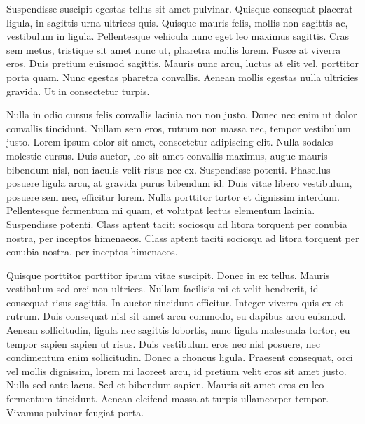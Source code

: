 Suspendisse suscipit egestas tellus sit amet pulvinar. Quisque consequat placerat ligula, in sagittis urna ultrices quis. Quisque mauris felis, mollis non sagittis ac, vestibulum in ligula. Pellentesque vehicula nunc eget leo maximus sagittis. Cras sem metus, tristique sit amet nunc ut, pharetra mollis lorem. Fusce at viverra eros. Duis pretium euismod sagittis. Mauris nunc arcu, luctus at elit vel, porttitor porta quam. Nunc egestas pharetra convallis. Aenean mollis egestas nulla ultricies gravida. Ut in consectetur turpis.

Nulla in odio cursus felis convallis lacinia non non justo. Donec nec enim ut dolor convallis tincidunt. Nullam sem eros, rutrum non massa nec, tempor vestibulum justo. Lorem ipsum dolor sit amet, consectetur adipiscing elit. Nulla sodales molestie cursus. Duis auctor, leo sit amet convallis maximus, augue mauris bibendum nisl, non iaculis velit risus nec ex. Suspendisse potenti. Phasellus posuere ligula arcu, at gravida purus bibendum id. Duis vitae libero vestibulum, posuere sem nec, efficitur lorem. Nulla porttitor tortor et dignissim interdum. Pellentesque fermentum mi quam, et volutpat lectus elementum lacinia. Suspendisse potenti. Class aptent taciti sociosqu ad litora torquent per conubia nostra, per inceptos himenaeos. Class aptent taciti sociosqu ad litora torquent per conubia nostra, per inceptos himenaeos.

Quisque porttitor porttitor ipsum vitae suscipit. Donec in ex tellus. Mauris vestibulum sed orci non ultrices. Nullam facilisis mi et velit hendrerit, id consequat risus sagittis. In auctor tincidunt efficitur. Integer viverra quis ex et rutrum. Duis consequat nisl sit amet arcu commodo, eu dapibus arcu euismod. Aenean sollicitudin, ligula nec sagittis lobortis, nunc ligula malesuada tortor, eu tempor sapien sapien ut risus. Duis vestibulum eros nec nisl posuere, nec condimentum enim sollicitudin. Donec a rhoncus ligula. Praesent consequat, orci vel mollis dignissim, lorem mi laoreet arcu, id pretium velit eros sit amet justo. Nulla sed ante lacus. Sed et bibendum sapien. Mauris sit amet eros eu leo fermentum tincidunt. Aenean eleifend massa at turpis ullamcorper tempor. Vivamus pulvinar feugiat porta.
